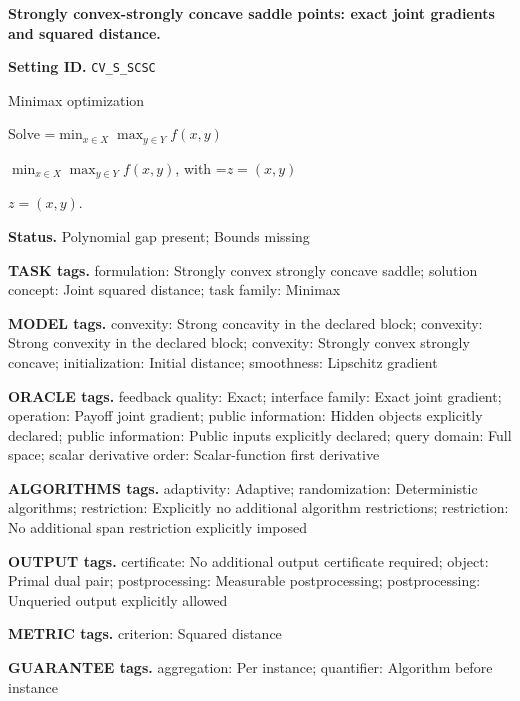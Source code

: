 \documentclass[10pt,a4paper]{article}
\newcommand{\AtlasMath}[1]{\par\begingroup\centering\setbox0=\hbox{$\displaystyle #1$}\ifdim\wd0>1.4\linewidth\typeout{ATLAS WIDE FORMULA: \the\wd0}\fi\ifdim\wd0>\linewidth\resizebox{\linewidth}{!}{\box0}\else\box0\fi\par\endgroup}
\newcommand{\AtlasInlineMath}[1]{\begingroup\setbox0=\hbox{$#1$}\ifdim\wd0>.4\linewidth\endgroup\AtlasMath{#1}\else\endgroup$#1$\fi}
\begin{document}
\raggedright

{\LARGE\bfseries\sffamily\color{AtlasNavy} Strongly convex-strongly concave saddle points: exact joint gradients and squared distance.\par}\vspace{5pt}


\textbf{Setting ID.} \texttt{CV\_\allowbreak{}S\_\allowbreak{}SCSC}



Minimax optimization



Solve \AtlasInlineMath{\min_{x\in X}\max_{y\in Y}f(x,y)}, with \AtlasInlineMath{z=(x,y)}.



\textbf{Status.} Polynomial gap present; Bounds missing



\textbf{TASK tags.} formulation: Strongly convex strongly concave saddle; solution concept: Joint squared distance; task family: Minimax



\textbf{MODEL tags.} convexity: Strong concavity in the declared block; convexity: Strong convexity in the declared block; convexity: Strongly convex strongly concave; initialization: Initial distance; smoothness: Lipschitz gradient



\textbf{ORACLE tags.} feedback quality: Exact; interface family: Exact joint gradient; operation: Payoff joint gradient; public information: Hidden objects explicitly declared; public information: Public inputs explicitly declared; query domain: Full space; scalar derivative order: Scalar-function first derivative



\textbf{ALGORITHMS tags.} adaptivity: Adaptive; randomization: Deterministic algorithms; restriction: Explicitly no additional algorithm restrictions; restriction: No additional span restriction explicitly imposed



\textbf{OUTPUT tags.} certificate: No additional output certificate required; object: Primal dual pair; postprocessing: Measurable postprocessing; postprocessing: Unqueried output explicitly allowed



\textbf{METRIC tags.} criterion: Squared distance



\textbf{GUARANTEE tags.} aggregation: Per instance; quantifier: Algorithm before instance
\end{document}
